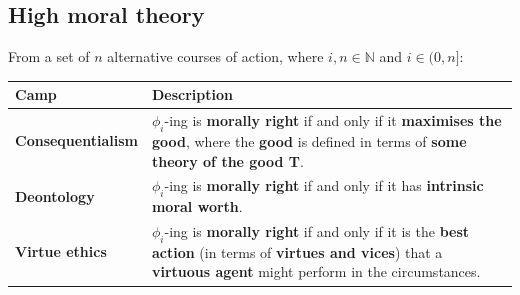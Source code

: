 \documentclass[11pt]{article}
\begin{document}
\subsection{High moral theory}
\label{sec:org00b25ff}
From a set of \(n\) alternative courses of action, where \(i, n \in \mathbb{N}\) and \(i \in (0, n]\):
\begin{center}
\begin{tabularx}{\textwidth}{|X|X|}
\hline
Camp & Description\\
\hline
\textbf{Consequentialism} & \(\phi_i\)-ing is \textbf{morally right} if and only if it \textbf{maximises the good}, where the \textbf{good} is defined in terms of \textbf{some theory of the good T}.\\
\hline
\textbf{Deontology} & \(\phi_i\)-ing is \textbf{morally right} if and only if it has \textbf{intrinsic moral worth}.\\
\hline
\textbf{Virtue ethics} & \(\phi_i\)-ing is \textbf{morally right} if and only if it is the \textbf{best action} (in terms of \textbf{virtues and vices}) that a \textbf{virtuous agent} might perform in the circumstances.\\
\hline
\end{tabularx}
\end{center}
 \newpage
\end{document}
